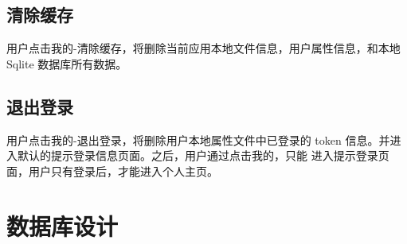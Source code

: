\subsection{清除缓存}
用户点击我的-清除缓存，将删除当前应用本地文件信息，用户属性信息，和本地 Sqlite 数据库所有数据。

\subsection{退出登录}
用户点击我的-退出登录，将删除用户本地属性文件中已登录的 token 信息。并进入默认的提示登录信息页面。之后，用户通过点击我的，只能
进入提示登录页面，用户只有登录后，才能进入个人主页。

\section{数据库设计}
		
